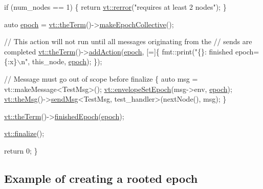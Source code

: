 \begin{DoxyCodeInclude}
  \textcolor{keywordflow}{if} (num\_nodes == 1) \{
    \textcolor{keywordflow}{return} \hyperlink{namespacevt_aff96ace008dc847d4c0f44cfa5dfb3a0}{vt::rerror}(\textcolor{stringliteral}{"requires at least 2 nodes"});
  \}

  \textcolor{keyword}{auto} \hyperlink{namespacevt_1_1config_a6bd1d6215bda0d8ca02811798399f689a05bdb92281360bcbfdf239ad3ccbde19}{epoch} = \hyperlink{namespacevt_a127580fdfcaba0b4171e5c48c5676733}{vt::theTerm}()->\hyperlink{structvt_1_1term_1_1_termination_detector_aeba62165ec8dfbc445e3631ff295f159}{makeEpochCollective}();

  \textcolor{comment}{// This action will not run until all messages originating from the}
  \textcolor{comment}{// sends are completed}
  \hyperlink{namespacevt_a127580fdfcaba0b4171e5c48c5676733}{vt::theTerm}()->\hyperlink{structvt_1_1term_1_1_term_action_a1227042cb4eb38937fb8ed34bcbdf998}{addAction}(\hyperlink{namespacevt_1_1config_a6bd1d6215bda0d8ca02811798399f689a05bdb92281360bcbfdf239ad3ccbde19}{epoch}, [=]\{
    fmt::print(\textcolor{stringliteral}{"\{\}: finished epoch=\{:x\}\(\backslash\)n"}, this\_node, \hyperlink{namespacevt_1_1config_a6bd1d6215bda0d8ca02811798399f689a05bdb92281360bcbfdf239ad3ccbde19}{epoch});
  \});

  \textcolor{comment}{// Message must go out of scope before finalize}
  \{
    \textcolor{keyword}{auto} msg = vt::makeMessage<TestMsg>();
    \hyperlink{namespacevt_a4a0a9928690206b588dbcac2afb71088}{vt::envelopeSetEpoch}(msg->env, \hyperlink{namespacevt_1_1config_a6bd1d6215bda0d8ca02811798399f689a05bdb92281360bcbfdf239ad3ccbde19}{epoch});
    \hyperlink{namespacevt_aeafd31f866aeb4dc6fc2f6ee97136350}{vt::theMsg}()->\hyperlink{group__preregister_ga0162a39473e7f9b490a79a7983d949ac}{sendMsg}<TestMsg, test\_handler>(nextNode(), msg);
  \}

  \hyperlink{namespacevt_a127580fdfcaba0b4171e5c48c5676733}{vt::theTerm}()->\hyperlink{structvt_1_1term_1_1_termination_detector_ad54d75c50bd3f34f30247817737bc303}{finishedEpoch}(\hyperlink{namespacevt_1_1config_a6bd1d6215bda0d8ca02811798399f689a05bdb92281360bcbfdf239ad3ccbde19}{epoch});

  \hyperlink{namespacevt_a540d90dbd6e97b69f1dcbc9ee9314cff}{vt::finalize}();

  \textcolor{keywordflow}{return} 0;
\}
\end{DoxyCodeInclude}
 \hypertarget{term_term-rooted-example}{}\subsection{Example of creating a rooted epoch}\label{term_term-rooted-example}

